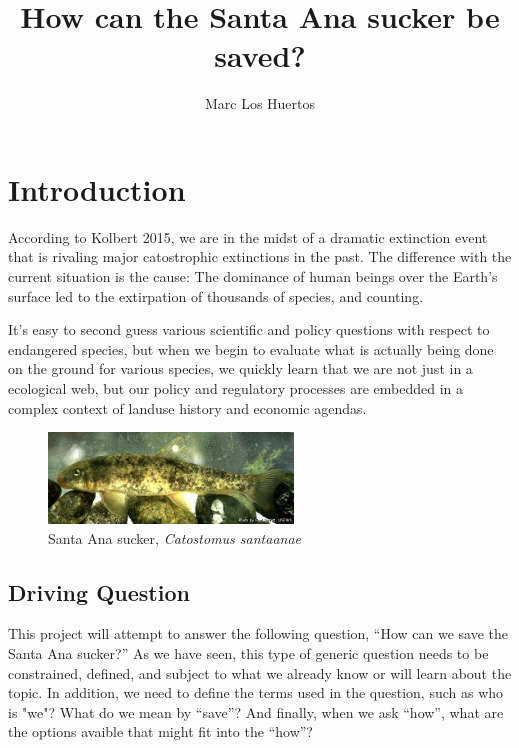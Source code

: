 \documentclass{article}\usepackage[]{graphicx}\usepackage[]{color}
\title{How can the Santa Ana sucker be saved?}
\author{Marc Los Huertos}
\begin{document}
\maketitle

\section{Introduction}

According to Kolbert 2015, we are in the midst of a dramatic extinction event that is rivaling major catostrophic extinctions in the past. The difference with the current situation is the cause: The dominance of human beings over the Earth's surface led to the extirpation of thousands of species, and counting. 

It's easy to second guess various scientific and policy questions with respect to endangered species, but when we begin to evaluate what is actually being done on the ground for various species, we quickly learn that we are not just in a ecological web, but our policy and regulatory processes are embedded in a complex context of landuse history and economic agendas.  

\begin{figure}
  \begin{center}
    \includegraphics[width=0.58\textwidth]{Catostomus_santaanae.jpg}
  \end{center}
  \caption{Santa Ana sucker, \emph{Catostomus santaanae}}
\end{figure}

\subsection{Driving Question}

This project will attempt to answer the following question, ``How can we save the Santa Ana sucker?'' As we have seen, this type of generic question needs to be constrained, defined, and subject to what we already know or will learn about the topic. In addition, we need to define the terms used in the question, such as who is "we"? What do we mean by ``save''?  And finally, when we ask ``how'', what are the options avaible that might fit into the ``how''? 
\end{document}
